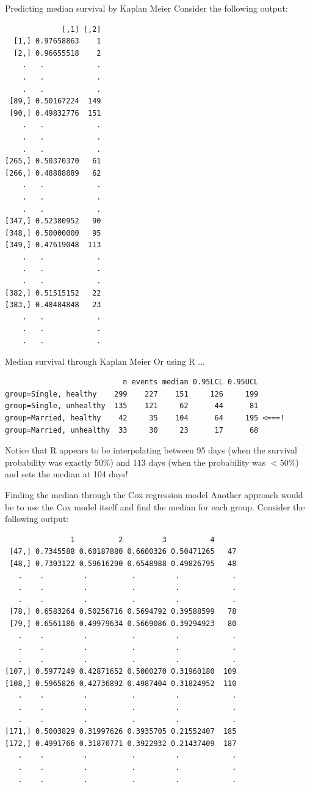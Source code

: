 \documentclass[envcountsect, 10pt, portrait, palatino]{beamer}
\begin{document}
\begin{frame}[fragile]{Predicting median survival by Kaplan Meier}
Consider the following output:

\scriptsize
\begin{verbatim}
             [,1] [,2]
  [1,] 0.97658863    1
  [2,] 0.96655518    2
    .   .            .
    .   .            .
    .   .            .
 [89,] 0.50167224  149
 [90,] 0.49832776  151
    .   .            .
    .   .            .
    .   .            .
[265,] 0.50370370   61
[266,] 0.48888889   62
    .   .            .
    .   .            .
    .   .            .
[347,] 0.52380952   90
[348,] 0.50000000   95
[349,] 0.47619048  113
    .   .            .
    .   .            .
    .   .            .
[382,] 0.51515152   22
[383,] 0.48484848   23
    .   .            .
    .   .            .
    .   .            .
\end{verbatim}
\end{frame}
\begin{frame}[fragile]{Median survival through Kaplan Meier}
Or using R ...

\small
\begin{verbatim}
                           n events median 0.95LCL 0.95UCL
group=Single, healthy    299    227    151     126     199
group=Single, unhealthy  135    121     62      44      81
group=Married, healthy    42     35    104      64     195 <===!
group=Married, unhealthy  33     30     23      17      68
\end{verbatim}
\normalsize
Notice that R appears to be interpolating between 95 days (when the survival probability was exactly 50\%) and 113 days (when the probability was $<50\%$) and sets the median at 104 days!
\end{frame}
\begin{frame}[fragile]{Finding the median through the Cox regression model}
Another approach would be to use the Cox model itself and find the median for each group. Consider the following output:

\scriptsize
\begin{verbatim}
               1          2         3          4
 [47,] 0.7345588 0.60187880 0.6600326 0.50471265   47
 [48,] 0.7303122 0.59616290 0.6548988 0.49826795   48
   .    .         .          .         .            .
   .    .         .          .         .            .
   .    .         .          .         .            .
 [78,] 0.6583264 0.50256716 0.5694792 0.39588599   78
 [79,] 0.6561186 0.49979634 0.5669086 0.39294923   80
   .    .         .          .         .            .
   .    .         .          .         .            .
   .    .         .          .         .            .
[107,] 0.5977249 0.42871652 0.5000270 0.31960180  109
[108,] 0.5965826 0.42736892 0.4987404 0.31824952  110
   .    .         .          .         .            .
   .    .         .          .         .            .
   .    .         .          .         .            .
[171,] 0.5003829 0.31997626 0.3935705 0.21552407  185
[172,] 0.4991766 0.31870771 0.3922932 0.21437409  187
   .    .         .          .         .            .
   .    .         .          .         .            .
   .    .         .          .         .            .
\end{verbatim}
\end{frame}
\end{document}
